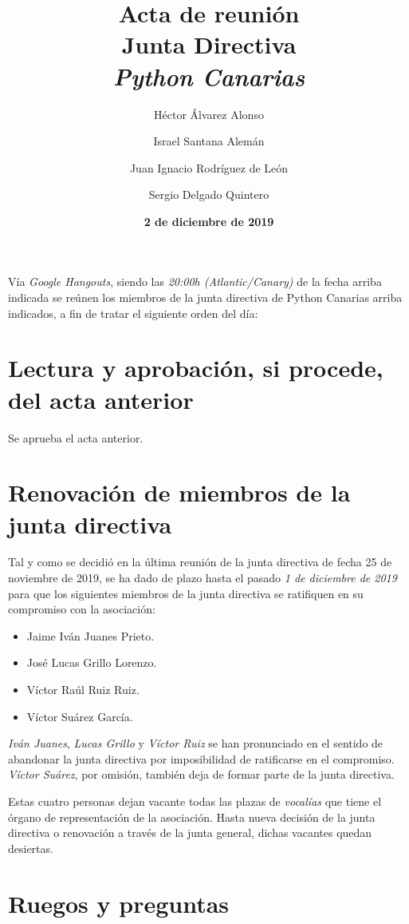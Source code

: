 \documentclass[a4paper, 12pt]{article}
\title{\huge \textbf{Acta de reunión} \\ Junta Directiva \\ \textit{Python Canarias}}
\date{\textbf{2 de diciembre de 2019}}
\author{
    Héctor Álvarez Alonso \and
    Israel Santana Alemán \and
    Juan Ignacio Rodríguez de León \and 
    Sergio Delgado Quintero
}
\begin{document}
\renewcommand{\contentsname}{Orden del día}

\maketitle

Vía \textit{Google Hangouts}, siendo las \textit{20:00h (Atlantic/Canary)} de la fecha arriba indicada se reúnen los miembros de la junta directiva de Python Canarias arriba indicados, a fin de tratar el siguiente orden del día:

\tableofcontents

\section{Lectura y aprobación, si procede, del acta anterior}

Se aprueba el acta anterior.

\section{Renovación de miembros de la junta directiva}

Tal y como se decidió en la última reunión de la junta directiva de fecha 25 de noviembre de 2019, se ha dado de plazo hasta el pasado \textit{1 de diciembre de 2019} para que los siguientes miembros de la junta directiva se ratifiquen en su compromiso con la asociación:

\begin{itemize}
    \item Jaime Iván Juanes Prieto.
    \item José Lucas Grillo Lorenzo.
    \item Víctor Raúl Ruiz Ruiz.
    \item Víctor Suárez García.
\end{itemize}

\textit{Iván Juanes}, \textit{Lucas Grillo} y \textit{Víctor Ruiz} se han pronunciado en el sentido de abandonar la junta directiva por imposibilidad de ratificarse en el compromiso. \textit{Víctor Suárez}, por omisión, también deja de formar parte de la junta directiva.

Estas cuatro personas dejan vacante todas las plazas de \textit{vocalías} que tiene el órgano de representación de la asociación. Hasta nueva decisión de la junta directiva o renovación a través de la junta general, dichas vacantes quedan desiertas.

\section{Ruegos y preguntas}
\end{document}
